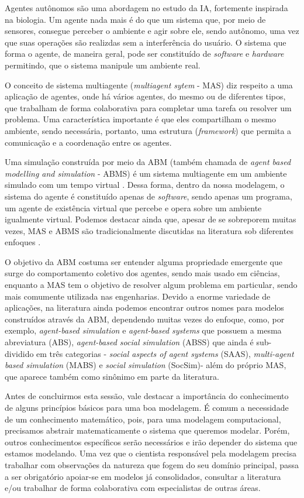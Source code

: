 Agentes autônomos %
são uma abordagem no estudo da IA, fortemente inspirada na biologia. Um agente nada mais é do que um sistema que, por meio de sensores, consegue perceber o ambiente e agir sobre ele, sendo autônomo, uma vez que suas operações são realizdas sem a interferência do usuário. O sistema que forma o agente, de maneira geral, pode ser constituído de \textit{software} e \textit{hardware} permitindo, que o sistema manipule um ambiente real.

O conceito de sistema multiagente (\textit{multiagent sytem} - MAS) diz respeito a uma aplicação de agentes, onde há vários agentes, do mesmo ou de diferentes tipos, que trabalham de forma colaborativa para completar uma tarefa ou resolver um problema. Uma característica importante é que eles compartilham o mesmo ambiente, sendo necessária, portanto, uma estrutura (\textit{framework}) que permita a comunicação e a coordenação entre os agentes.

Uma simulação construída  por meio da ABM  (também chamada de \textit{agent based modelling and simulation} - ABMS) é um sistema multiagente em um ambiente simulado com um tempo virtual \cite{UFRGS}.  Dessa forma, dentro da nossa modelagem, o sistema do agente é constituído apenas de \textit{software}, sendo apenas um programa, um agente de existência virtual que percebe e opera sobre um ambiente igualmente virtual. Podemos destacar ainda que, apesar de se sobreporem muitas vezes, MAS e ABMS são tradicionalmente discutidas na literatura sob diferentes enfoques \cite{Rocha17}.  

O objetivo da ABM  costuma ser entender alguma propriedade emergente que surge do comportamento coletivo dos agentes, sendo mais usado em ciências, enquanto a MAS tem o objetivo de resolver algum problema em particular, sendo mais comumente utilizada nas engenharias. Devido a enorme variedade de aplicações, na literatura ainda podemos encontrar outros nomes para modelos construídos através da ABM, dependendo muitas vezes do enfoque, como, por exemplo, \textit{agent-based simulation} e \textit{agent-based systems} que possuem a mesma abreviatura (ABS), \textit{agent-based social simulation} (ABSS) que ainda é sub-dividido em três categorias - \textit{social aspects of agent systems }(SAAS), \textit{multi-agent based simulation} (MABS) e \textit{social simulation} (SocSim)-  além do próprio MAS, que aparece também como sinônimo em parte da literatura\cite{Rocha17}.

Antes de concluirmos esta sessão, vale destacar a importância do conhecimento de alguns princípios  básicos para uma boa modelagem. É comum a necessidade de um conhecimento matemático, pois, para uma modelagem computacional, precisamos abstrair matematicamente o sistema que queremos modelar.  Porém, outros conhecimentos específicos serão necessários e irão depender do sistema que estamos modelando. Uma vez que o cientista responsável pela modelagem precisa trabalhar com observações da natureza que fogem do seu domínio principal, passa a ser obrigatório apoiar-se em modelos já consolidados, consultar a literatura e/ou trabalhar de forma colaborativa com especialistas de outras áreas.

